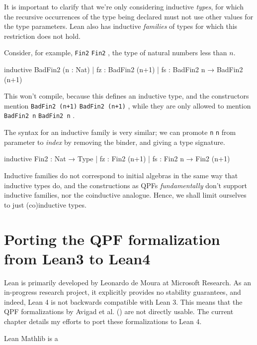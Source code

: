 \documentclass[titlepage]{report}
\newcommand\lean[1]{%
\ifx\leanmode\undefined%
\def\leanmode{1}%
\texttt{\small #1}%
\undef\leanmode%
\else%
\texttt{#1}%
\fi%
}
\newcommand\etal{\emph{et al.}}
\begin{document}
It is important to clarify that we're only considering inductive \emph{types}, 
for which the recursive occurrences of the type being declared must not use other values for the type parameters. Lean also has inductive \emph{families} of types for which this restriction does not hold.

Consider, for example, \lean{Fin2}, the type of natural numbers less than $n$.
\begin{badleancode}
    inductive BadFin2 (n : Nat)
    | fz : BadFin2 (n+1)
    | fs : BadFin2 n → BadFin2 (n+1)
\end{badleancode}

This won't compile, because this defines an inductive type, and the constructors mention \lean{BadFin2 (n+1)}, while they are only allowed to mention \lean{BadFin2 n}.

The syntax for an inductive family is very similar; we can promote \lean{n} from parameter to \emph{index} by removing the binder, and giving a type signature.

\begin{leancode}
    inductive Fin2 : Nat → Type
    | fz : Fin2 (n+1)
    | fs : Fin2 n → Fin2 (n+1)
\end{leancode}

Inductive families do not correspond to initial algebras in the same way that inductive types do, and the constructions as QPFs \emph{fundamentally} don't support inductive families, nor the coinductive analogue.
Hence, we shall limit ourselves to just (co)inductive types.




\chapter{Porting the QPF formalization from Lean3 to Lean4}
\label{ch:porting}

Lean is primarily developed by Leonardo de Moura at Microsoft Research. As an in-progress research project, it explicitly provides no stability guarantees, and indeed, Lean 4 is not backwards compatible with Lean 3.
This means that the QPF formalizations by Avigad et al.
(\cite{avigadDataTypesQuotients2019a}) are not directly usable. The current chapter details my efforts to port these formalizations to Lean 4.


Lean Mathlib is a 
\end{document}
